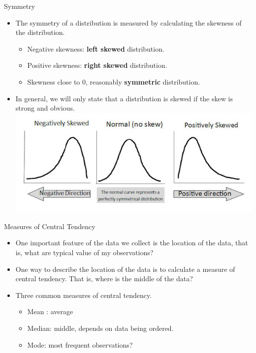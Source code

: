 \documentclass[ignorenonframetext,]{beamer}
\begin{document}
\begin{frame}{Symmetry}

\begin{itemize}
\item
  The symmetry of a distribution is measured by calculating the skewness
  of the distribution.

  \begin{itemize}
  \item
    Negative skewness: \textbf{left skewed} distribution.
  \item
    Positive skewness: \textbf{right skewed} distribution.
  \item
    Skewness close to 0, reasonably \textbf{symmetric} distribution.
  \end{itemize}
\item
  In general, we will only state that a distribution is skewed if the
  skew is strong and obvious. \includegraphics{measure-of-skewness.jpg} 
\end{itemize}

\end{frame}

\begin{frame}{Measures of Central Tendency}

\begin{itemize}
\item
  One important feature of the data we collect is the location of the
  data, that is, what are typical value of my observations?
\item
  One way to describe the location of the data is to calculate a measure
  of central tendency. That is, where is the middle of the data?
\item
  Three common measures of central tendency.

  \begin{itemize}
  \item
    Mean : average
  \item
    Median: middle, depends on data being ordered.
  \item
    Mode: most frequent observations?
  \end{itemize}
\end{itemize}

\end{frame}
\end{document}
